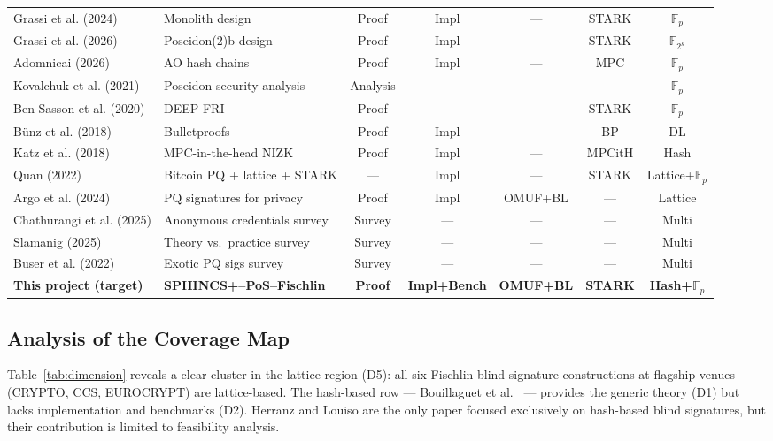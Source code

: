 \documentclass[11pt,a4paper]{article}
\newcommand{\Fp}{\mathbb{F}_p}
\begin{document}
\begin{table}[t]
\begin{tabularx}{\textwidth}{l>{\raggedright\arraybackslash}p{2.8cm}ccccc}
Grassi et al. (2024) \cite{Grassi2024Monolith} & Monolith design & Proof & Impl & --- & STARK & $\Fp$ \\
Grassi et al. (2026) \cite{Grassi2026Poseidon2b} & Poseidon(2)b design & Proof & Impl & --- & STARK & $\mathbb{F}_{2^k}$ \\
Adomnicai (2026) \cite{Adomnicai2026} & AO hash chains & Proof & Impl & --- & MPC & $\Fp$ \\
Kovalchuk et al. (2021) \cite{2021Security} & Poseidon security analysis & Analysis & --- & --- & --- & $\Fp$ \\
Ben-Sasson et al. (2020) \cite{2019DEEP} & DEEP-FRI & Proof & --- & --- & STARK & $\Fp$ \\
B\"unz et al. (2018) \cite{Bunz2018Bulletproofs} & Bulletproofs & Proof & Impl & --- & BP & DL \\
Katz et al. (2018) \cite{Katz2018ImprovedNIZK} & MPC-in-the-head NIZK & Proof & Impl & --- & MPCitH & Hash \\
Quan (2022) \cite{Quan2022} & Bitcoin PQ + lattice + STARK & --- & Impl & --- & STARK & Lattice+$\Fp$ \\
Argo et al. (2024) \cite{Argo2024PracticalPQ} & PQ signatures for privacy & Proof & Impl & OMUF+BL & --- & Lattice \\
Chathurangi et al. (2025) \cite{Chathurangi2025Advances} & Anonymous credentials survey & Survey & --- & --- & --- & Multi \\
Slamanig (2025) \cite{Slamanig2025PrivacyAuth} & Theory vs.\ practice survey & Survey & --- & --- & --- & Multi \\
Buser et al. (2022) \cite{Buser2022ExoticSigs} & Exotic PQ sigs survey & Survey & --- & --- & --- & Multi \\
\midrule
\textbf{This project (target)} & \textbf{SPHINCS+--PoS--Fischlin} & \textbf{Proof} & \textbf{Impl+Bench} & \textbf{OMUF+BL} & \textbf{STARK} & \textbf{Hash+$\Fp$} \\
\bottomrule
\end{tabularx}
\end{table}

\subsection{Analysis of the Coverage Map}

Table~\ref{tab:dimension} reveals a clear cluster in the lattice region (D5): all six Fischlin
blind-signature constructions at flagship venues (CRYPTO, CCS, EUROCRYPT) are lattice-based.
The hash-based row --- Bouillaguet et al.~\cite{Bouillaguet2026BlindingPH} --- provides the
generic theory (D1) but lacks implementation and benchmarks (D2).  Herranz and Louiso
\cite{Herranz2025HashBased} are the only paper focused exclusively on hash-based blind
signatures, but their contribution is limited to feasibility analysis.
\end{document}
